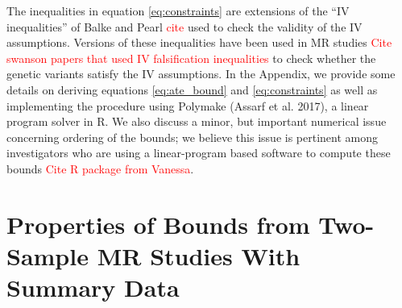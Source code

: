\documentclass[
]{article}
\theoremstyle{plain}
\begin{document}
The inequalities in equation \eqref{eq:constraints} are extensions of the ``IV inequalities'' of Balke and Pearl \textcolor{red}{cite} used to check the validity of the IV assumptions. Versions of these inequalities have been used in MR studies \textcolor{red}{Cite swanson papers that used IV falsification inequalities} to check whether the genetic variants satisfy the IV assumptions. In the Appendix, we provide some details on deriving equations \eqref{eq:ate_bound} and \eqref{eq:constraints} as well as implementing the procedure using Polymake (Assarf et al. 2017), a linear program solver in R. We also discuss a minor, but important numerical issue concerning ordering of the bounds; we believe this issue is pertinent among investigators who are using a linear-program based software to compute these bounds \textcolor{red}{Cite R package from Vanessa}.



\hypertarget{properties-of-bounds-from-summary-level-data}{%
\section{Properties of Bounds from Two-Sample MR Studies With Summary Data}\label{properties-of-bounds-from-summary-level-data}}
\end{document}
